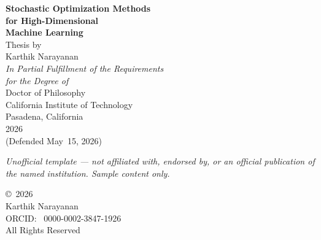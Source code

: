 \documentclass[11pt,twoside,openright]{book}
\begin{document}
\begin{titlepage}
\thispagestyle{empty}
\begin{center}

\vspace*{0.15\textheight}

{\Huge\bfseries Stochastic Optimization Methods\\[6pt]
for High-Dimensional\\[6pt]
Machine Learning}\\[36pt]

{\LARGE Thesis by}\\[18pt]

{\LARGE Karthik Narayanan}\\[48pt]

{\large\textit{In Partial Fulfillment of the Requirements\\[4pt]
for the Degree of}}\\[18pt]

{\LARGE Doctor of Philosophy}\\[48pt]

{\large California Institute of Technology}\\[6pt]
{\large Pasadena, California}\\[30pt]

{\large 2026}\\[18pt]

{\normalsize\color{MidGray}(Defended May~15, 2026)}

\vfill
{\footnotesize\itshape Unofficial template --- not affiliated with, endorsed by, or an official publication of the named institution. Sample content only.}
\end{center}
\end{titlepage}

\cleardoublepage
\thispagestyle{empty}
\vspace*{0.4\textheight}

\begin{center}
{\large\copyright\ 2026}\\[12pt]
{\large Karthik Narayanan}\\[12pt]
{\normalsize ORCID: \faOrcid\ 0000-0002-3847-1926}\\[24pt]
{\normalsize All Rights Reserved}
\end{center}

\cleardoublepage
\end{document}
